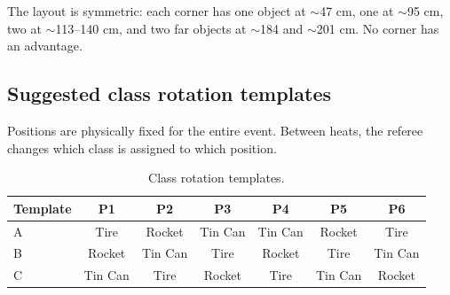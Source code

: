 \documentclass[a4]{article}
\begin{document}
The layout is symmetric: each corner has one object at $\sim$47 cm, one at $\sim$95 cm, two at $\sim$113--140 cm, and two far objects at $\sim$184 and $\sim$201 cm. No corner has an advantage.

\subsection*{Suggested class rotation templates}

Positions are physically fixed for the entire event. Between heats, the referee changes which class is assigned to which position.

\begin{table}[H]
\centering
\begin{tabular}{lcccccc}
\toprule
\textbf{Template} & \textbf{P1} & \textbf{P2} & \textbf{P3} & \textbf{P4} & \textbf{P5} & \textbf{P6} \\
\midrule
A & Tire & Rocket & Tin Can & Tin Can & Rocket & Tire \\
B & Rocket & Tin Can & Tire & Rocket & Tire & Tin Can \\
C & Tin Can & Tire & Rocket & Tire & Tin Can & Rocket \\
\bottomrule
\end{tabular}
\caption{Class rotation templates.}
\end{table}
\end{document}
